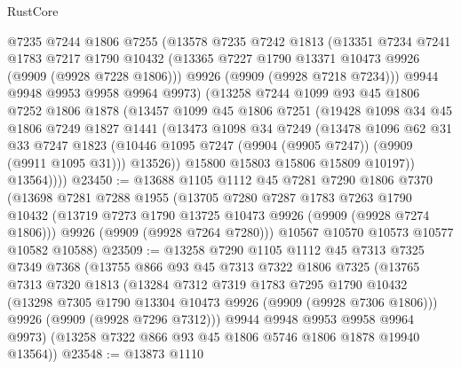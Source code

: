 \begin{lexlean}{RustCore}
\begin{coremodule}
          @7235
          @7244
          @1806
          @7255
          (@13578
            @7235
            @7242
            @1813
            (@13351
              @7234
              @7241
              @1783
              @7217
              @1790
              @10432
              (@13365 @7227 @1790 @13371 @10473 @9926 (@9909 (@9928 @7228 @1806)))
              @9926
              (@9909 (@9928 @7218 @7234)))
            @9944
            @9948
            @9953
            @9958
            @9964
            @9973)
          (@13258
            @7244
            @1099
            @93
            @45
            @1806
            @7252
            @1806
            @1878
            (@13457
              @1099
              @45
              @1806
              @7251
              (@19428
                @1098
                @34
                @45
                @1806
                @7249
                @1827
                @1441
                (@13473
                  @1098
                  @34
                  @7249
                  (@13478
                    @1096
                    @62
                    @31
                    @33
                    @7247
                    @1823
                    (@10446 @1095 @7247 (@9904 (@9905 @7247)) (@9909 (@9911 @1095 @31)))
                    @13526))
                @15800
                @15803
                @15806
                @15809
                @10197))
            @13564))))
@23450 := @13688
    @1105
    @1112
    @45
    @7281
    @7290
    @1806
    @7370
    (@13698
      @7281
      @7288
      @1955
      (@13705
        @7280
        @7287
        @1783
        @7263
        @1790
        @10432
        (@13719 @7273 @1790 @13725 @10473 @9926 (@9909 (@9928 @7274 @1806)))
        @9926
        (@9909 (@9928 @7264 @7280)))
      @10567
      @10570
      @10573
      @10577
      @10582
      @10588)
@23509 := @13258
    @7290
    @1105
    @1112
    @45
    @7313
    @7325
    @7349
    @7368
    (@13755
      @866
      @93
      @45
      @7313
      @7322
      @1806
      @7325
      (@13765
        @7313
        @7320
        @1813
        (@13284
          @7312
          @7319
          @1783
          @7295
          @1790
          @10432
          (@13298 @7305 @1790 @13304 @10473 @9926 (@9909 (@9928 @7306 @1806)))
          @9926
          (@9909 (@9928 @7296 @7312)))
        @9944
        @9948
        @9953
        @9958
        @9964
        @9973)
      (@13258 @7322 @866 @93 @45 @1806 @5746 @1806 @1878 @19940 @13564))
@23548 := @13873
    @1110

\end{coremodule}
\end{lexlean}
